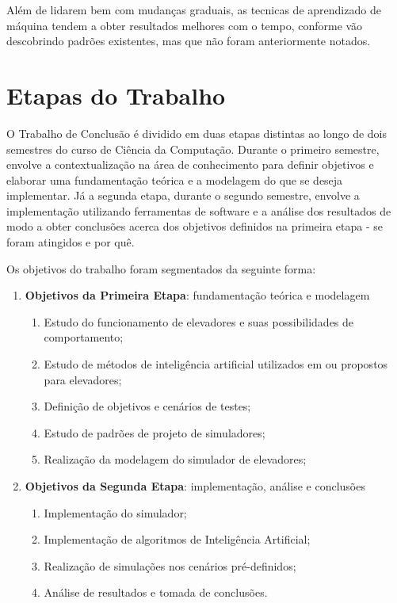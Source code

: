 Além de lidarem bem com mudanças graduais, as tecnicas de aprendizado de máquina
tendem a obter resultados melhores com o tempo, conforme vão descobrindo padrões
existentes, mas que não foram anteriormente notados.

\section{\label{chap:stages}Etapas do Trabalho}

O Trabalho de Conclusão é dividido em duas etapas distintas ao longo de dois
semestres do curso de Ciência da Computação. Durante o primeiro semestre,
envolve a contextualização na área de conhecimento para definir objetivos e
elaborar uma fundamentação teórica e a modelagem do que se deseja implementar.
Já a segunda etapa, durante o segundo semestre, envolve a implementação
utilizando ferramentas de software e a análise dos resultados de modo a obter
conclusões acerca dos objetivos definidos na primeira etapa - se foram atingidos
e por quê.

Os objetivos do trabalho foram segmentados da seguinte forma:

\begin{enumerate}
  \item \textbf{Objetivos da Primeira Etapa}: fundamentação teórica e modelagem
  \begin{enumerate}[label*=\arabic*.]
    \item Estudo do funcionamento de elevadores e suas possibilidades de
          comportamento;
    \item Estudo de métodos de inteligência artificial utilizados em ou
          propostos para elevadores;
    \item Definição de objetivos e cenários de testes;
    \item Estudo de padrões de projeto de simuladores;
    \item Realização da modelagem do simulador de elevadores;
  \end{enumerate}
  \item \textbf{Objetivos da Segunda Etapa}: implementação, análise e conclusões
  \begin{enumerate}[label*=\arabic*.]
    \item Implementação do simulador;
    \item Implementação de algoritmos de Inteligência Artificial;
    \item Realização de simulações nos cenários pré-definidos;
    \item Análise de resultados e tomada de conclusões.
  \end{enumerate}
\end{enumerate}

